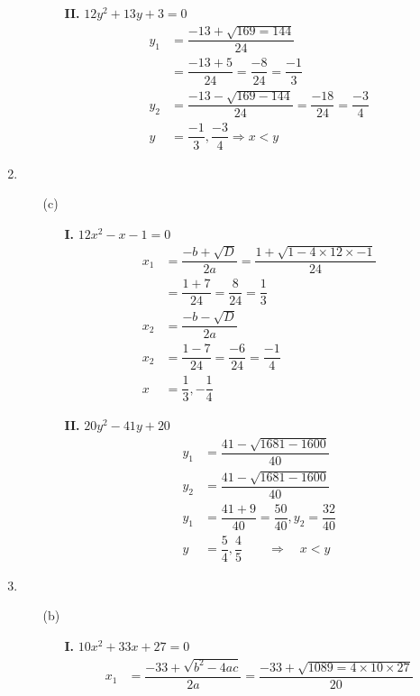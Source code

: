 \begin{multicols}{2}
\begin{enumerate}
\begin{itemize}
\begin{itemize}
\item[ {\bf II.}] $12y^2 + 13y + 3 = 0$\\
\begin{align*}
  y_1 & = \dfrac{-13 + \sqrt{169 = 144}}{24}\\
  & = \dfrac{-13 + 5}{24} = \dfrac{-8}{24} = \dfrac{-1}{3}\\
  y_2 & = \dfrac{-13 - \sqrt{169 - 144}}{24} = \dfrac{-18}{24} = \dfrac{-3}{4}\\
  y & = \dfrac{-1}{3}, \dfrac{-3}{4} \Rightarrow x < y
\end{align*}
\end{itemize}
\end{itemize}
\item
\begin{itemize}
\item[(c)]
\begin{itemize}
\item[{\bf I.}] $12x^2 - x - 1 = 0$
  \begin{align*}
    x_1 & = \dfrac{-b + \sqrt{D}}{2a} = \dfrac{1 + \sqrt{1 - 4 \times 12 \times -1}}{24}\\
    & = \dfrac{1 + 7}{24} = \dfrac{8}{24} = \dfrac{1}{3}\\
    x_2 & = \dfrac{-b - \sqrt{D}}{2a}\\
    x_2 & = \dfrac{1 - 7}{24} = \dfrac{-6}{24} = \dfrac{-1}{4}\\
    x & = \dfrac{1}{3}, -\dfrac{1}{4}
  \end{align*}
\item[{\bf II.}] $20y^2 - 41y + 20$
\begin{align*}
  y_1 & = \dfrac{41 - \sqrt{1681 - 1600}}{40}\\
  y_2 & = \dfrac{41 - \sqrt{1681 - 1600}}{40}\\
  y_1 & = \dfrac{41 + 9}{40} = \dfrac{50}{40}, y_2 = \dfrac{32}{40}\\
  y & = \dfrac{5}{4}, \dfrac{4}{5} \qquad \Rightarrow \quad x < y
\end{align*}
\end{itemize}
\end{itemize}
\item
\begin{itemize}
\item[(b)]
\begin{itemize}
\item[{\bf I.}] $10x^2 + 33x + 27 = 0$
\begin{align*}
  x_1 & = \dfrac{-33 + \sqrt{b^2 - 4ac}}{2a} = \dfrac{-33 + \sqrt{1089 = 4 \times 10 \times 27}}{20}

\end{align*}
\end{itemize}
\end{itemize}
\end{enumerate}
\end{multicols}

